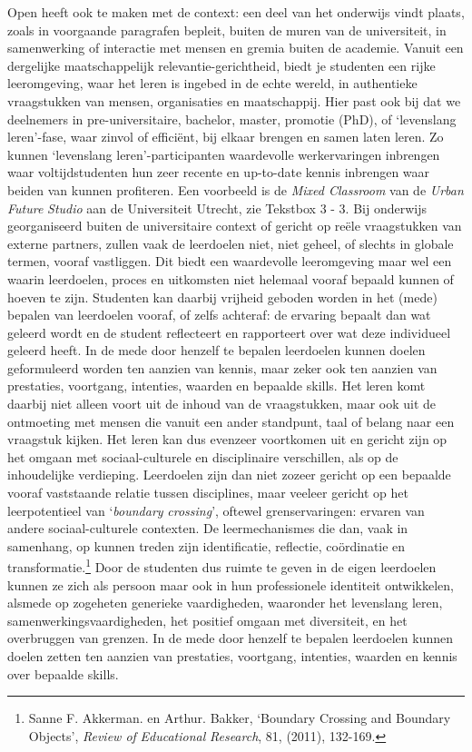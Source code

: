 \documentclass[smallauthor, chapterhaspagenum, nochapterinheader, pagenuminheader,  bigchapnum,medium2, tocpages,  garamond, titleinheader]{jote-book}
\begin{document}
	Open heeft ook te maken met de context: een deel van het onderwijs vindt plaats, zoals in voorgaande paragrafen bepleit, buiten de muren van de universiteit, in samenwerking of interactie met mensen en gremia buiten de academie. Vanuit een dergelijke maatschappelijk relevantie-gerichtheid, biedt je studenten een rijke leeromgeving, waar het leren is ingebed in de echte wereld, in authentieke vraagstukken van mensen, organisaties en maatschappij. Hier past ook bij dat we deelnemers in pre-universitaire, bachelor, master, promotie (PhD), of ‘levenslang leren'-fase, waar zinvol of efficiënt, bij elkaar brengen en samen laten leren. Zo kunnen ‘levenslang leren'-participanten waardevolle werkervaringen inbrengen waar voltijdstudenten hun zeer recente en up-to-date kennis inbrengen waar beiden van kunnen profiteren. Een voorbeeld is de \emph{Mixed Classroom} van de \emph{Urban }\emph{Future}\emph{ Studio} aan de Universiteit Utrecht, zie Tekstbox 3 - 3. Bij onderwijs georganiseerd buiten de universitaire context of gericht op reële vraagstukken van externe partners, zullen vaak de leerdoelen niet, niet geheel, of slechts in globale termen, vooraf vastliggen. Dit biedt een waardevolle leeromgeving maar wel een waarin leerdoelen, proces en uitkomsten niet helemaal vooraf bepaald kunnen of hoeven te zijn. Studenten kan daarbij vrijheid geboden worden in het (mede) bepalen van leerdoelen vooraf, of zelfs achteraf: de ervaring bepaalt dan wat geleerd wordt en de student reflecteert en rapporteert over wat deze individueel geleerd heeft. In de mede door henzelf te bepalen leerdoelen kunnen doelen geformuleerd worden ten aanzien van kennis, maar zeker ook ten aanzien van prestaties, voortgang, intenties, waarden en bepaalde skills. Het leren komt daarbij niet alleen voort uit de inhoud van de vraagstukken, maar ook uit de ontmoeting met mensen die vanuit een ander standpunt, taal of belang naar een vraagstuk kijken. Het leren kan dus evenzeer voortkomen uit en gericht zijn op het omgaan met sociaal-culturele en disciplinaire verschillen, als op de inhoudelijke verdieping. Leerdoelen zijn dan niet zozeer gericht op een bepaalde vooraf vaststaande relatie tussen disciplines, maar veeleer gericht op het leerpotentieel van ‘\emph{boundary}\emph{ crossing}', oftewel grenservaringen: ervaren van andere sociaal-culturele contexten. De leermechanismes die dan, vaak in samenhang, op kunnen treden zijn identificatie, reflectie, coördinatie en transformatie.\footnote{Sanne F. Akkerman. en Arthur. Bakker, ‘Boundary Crossing and Boundary Objects', \emph{Review of }\emph{Educational}\emph{ Research}, 81, (2011), 132-169.} Door de studenten dus ruimte te geven in de eigen leerdoelen kunnen ze zich als persoon maar ook in hun professionele identiteit ontwikkelen, alsmede op zogeheten generieke vaardigheden, waaronder het levenslang leren, samenwerkingsvaardigheden, het positief omgaan met diversiteit, en het overbruggen van grenzen. In de mede door henzelf te bepalen leerdoelen kunnen doelen zetten ten aanzien van prestaties, voortgang, intenties, waarden en kennis over bepaalde skills.
\end{document}
